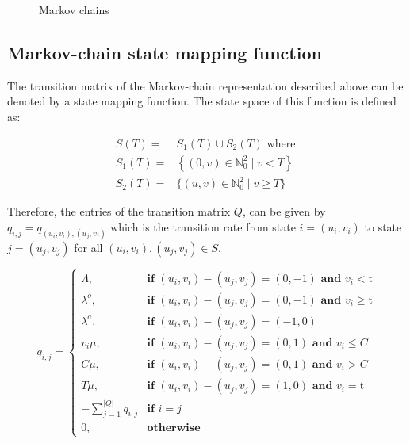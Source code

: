 \documentclass{article}
\begin{document}
\begin{figure}[h]
    \caption{Markov chains} 
    \label{markov_model}
\end{figure}

\subsection{Markov-chain state mapping function}
The transition matrix of the Markov-chain representation described above can be denoted by a state mapping function. The state space of this function is defined as:



\begin{align}
    S(T) =& S_1(T) \cup S_2(T) \text{ where:} \nonumber \\
    S_1(T) =& \left\{(0, v)\in\mathbb{N}_0^2 \; | \; v < T \right\} \\
    S_2(T) =& \{(u, v)\in\mathbb{N}_0^2 \; | \; v \geq T \} \nonumber
\end{align}

Therefore, the entries of the transition matrix \(Q\), can be given by \( q_{i,j} = q_{(u_i, v_i),(u_j, v_j)} \) which is the transition rate from state \( i = (u_i, v_i) \) to state \( j = (u_j , v_j) \) for all \( (u_i, v_i), (u_j, v_j) \in S \).

\begin{equation}
    q_{i, j} = 
    \begin{cases}
        \Lambda, & \textbf{if } (u_i, v_i) - (u_j, v_j) = (0,-1) \textbf{ and } v_i < \text{t} \\
        \lambda^o, & \textbf{if } (u_i, v_i) - (u_j, v_j) = (0,-1) \textbf{ and } v_i \geq \text{t} \\
        \lambda^a, & \textbf{if } (u_i, v_i) - (u_j, v_j) = (-1,0) \\
        v_i \mu, & \textbf{if } (u_i, v_i) - (u_j, v_j) = (0,1) \textbf{ and } v_i \leq C\\
        C \mu, & \textbf{if } (u_i, v_i) - (u_j, v_j) = (0,1) \textbf{ and } v_i > C \\
        T \mu, & \textbf{if } (u_i, v_i) - (u_j, v_j) = (1,0) \textbf{ and } v_i = \text{t} \\
        -\sum_{j=1}^{|Q|}{q_{i,j}} & \textbf{if } i = j \\
        0, & \textbf{otherwise}
    \end{cases}
\end{equation}
\end{document}
